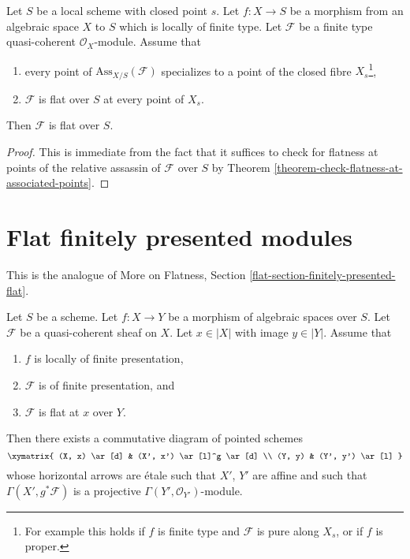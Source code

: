 \begin{lemma}
\label{lemma-check-along-closed-fibre}
Let $S$ be a local scheme with closed point $s$.
Let $f : X \to S$ be a morphism from an algebraic space $X$ to $S$
which is locally of finite type.
Let $\mathcal{F}$ be a finite type quasi-coherent $\mathcal{O}_X$-module.
Assume that
\begin{enumerate}
\item every point of $\text{Ass}_{X/S}(\mathcal{F})$ specializes
to a point of the closed fibre $X_s$\footnote{For example this holds if
$f$ is finite type and $\mathcal{F}$ is pure along $X_s$, or
if $f$ is proper.},
\item $\mathcal{F}$ is flat over $S$ at every point of $X_s$.
\end{enumerate}
Then $\mathcal{F}$ is flat over $S$.
\end{lemma}

\begin{proof}
This is immediate from the fact that it suffices to check for
flatness at points of the relative assassin of $\mathcal{F}$
over $S$ by
Theorem \ref{theorem-check-flatness-at-associated-points}.
\end{proof}




\section{Flat finitely presented modules}
\label{section-finitely-presented-flat}

\noindent
This is the analogue of More on Flatness, Section
\ref{flat-section-finitely-presented-flat}.

\begin{proposition}
\label{proposition-finite-presentation-flat-at-point}
Let $S$ be a scheme.
Let $f : X \to Y$ be a morphism of algebraic spaces over $S$.
Let $\mathcal{F}$ be a quasi-coherent sheaf on $X$.
Let $x \in |X|$ with image $y \in |Y|$.
Assume that
\begin{enumerate}
\item $f$ is locally of finite presentation,
\item $\mathcal{F}$ is of finite presentation, and
\item $\mathcal{F}$ is flat at $x$ over $Y$.
\end{enumerate}
Then there exists a commutative diagram of pointed schemes
$$
\xymatrix{
(X, x) \ar[d] & (X', x') \ar[l]^g \ar[d] \\
(Y, y) & (Y', y') \ar[l]
}
$$
whose horizontal arrows are \'etale such that $X'$, $Y'$
are affine and such that
$\Gamma(X', g^*\mathcal{F})$ is a projective
$\Gamma(Y', \mathcal{O}_{Y'})$-module.
\end{proposition}

